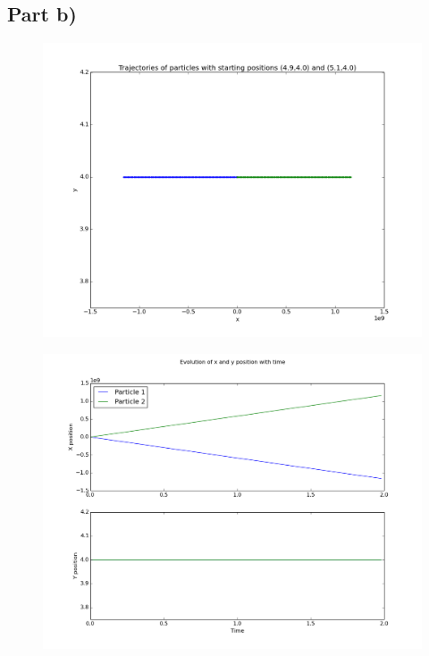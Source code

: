 \documentclass[a4paper,12pt]{article}
\begin{document}
\subsection{Part b)}

\begin{figure}[H]
\centering
\includegraphics[width = \linewidth]{lab6q5b.png}
\caption{}
\label{fig:q5b}
\end{figure}

\begin{figure}[H]
\centering
\includegraphics[width = \linewidth]{lab6q5bi.png}
\caption{}
\label{fig:q5bi}
\end{figure}
\end{document}
